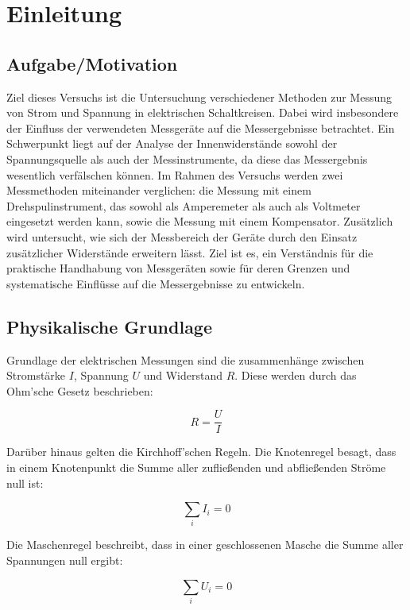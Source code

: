 \chapter{Einleitung}

\section{Aufgabe/Motivation}

Ziel dieses Versuchs ist die Untersuchung verschiedener Methoden zur Messung von Strom und Spannung in elektrischen Schaltkreisen. Dabei wird insbesondere der Einfluss der verwendeten Messgeräte auf die Messergebnisse betrachtet. Ein Schwerpunkt liegt auf der Analyse der Innenwiderstände sowohl der Spannungsquelle als auch der Messinstrumente, da diese das Messergebnis wesentlich verfälschen können.
Im Rahmen des Versuchs werden zwei Messmethoden miteinander verglichen: die Messung mit einem Drehspulinstrument, das sowohl als Amperemeter als auch als Voltmeter eingesetzt werden kann, sowie die Messung mit einem Kompensator. Zusätzlich wird untersucht, wie sich der Messbereich der Geräte durch den Einsatz zusätzlicher Widerstände erweitern lässt. Ziel ist es, ein Verständnis für die praktische Handhabung von Messgeräten sowie für deren Grenzen und systematische Einflüsse auf die Messergebnisse zu entwickeln.

\section{Physikalische Grundlage}
\cite{skript25}
Grundlage der elektrischen Messungen sind die zusammenhänge zwischen Stromstärke $I$, Spannung $U$ und Widerstand $R$. Diese werden durch das Ohm'sche Gesetz beschrieben:

\begin{equation}
    R = \frac{U}{I}
    \label{eq:ohm}
\end{equation}

Darüber hinaus gelten die Kirchhoff'schen Regeln. Die Knotenregel besagt, dass in einem Knotenpunkt die Summe aller zufließenden und abfließenden Ströme null ist:

\begin{equation}
    \sum_{i} I_i = 0
    \label{eq:knoten}
\end{equation}

Die Maschenregel beschreibt, dass in einer geschlossenen Masche die Summe aller Spannungen null ergibt:

\begin{equation}
    \sum_{i} U_i = 0
    \label{eq:masche}
\end{equation}

